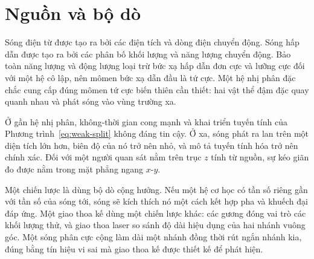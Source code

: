 \section{Nguồn và bộ dò}

Sóng điện từ được tạo ra bởi các điện tích và dòng điện chuyển động. Sóng hấp dẫn được tạo ra bởi các phân bố khối lượng và năng lượng chuyển động. Bảo toàn năng lượng và động lượng loại trừ bức xạ hấp dẫn đơn cực và lưỡng cực đối với một hệ cô lập, nên mômen bức xạ dẫn đầu là tứ cực. Một hệ nhị phân đặc chắc cung cấp đúng mômen tứ cực biến thiên cần thiết: hai vật thể đậm đặc quay quanh nhau và phát sóng vào vùng trường xa.

Ở gần hệ nhị phân, không-thời gian cong mạnh và khai triển tuyến tính của Phương trình~\eqref{eq:weak-split} không đáng tin cậy. Ở xa, sóng phát ra lan trên một diện tích lớn hơn, biên độ của nó trở nên nhỏ, và mô tả tuyến tính hóa trở nên chính xác. Đối với một người quan sát nằm trên trục \(z\) tính từ nguồn, sự kéo giãn đo được nằm trong mặt phẳng ngang \(x\)-\(y\).

\begin{classroomqa}
\end{classroomqa}

Một chiến lược là dùng bộ dò cộng hưởng. Nếu một hệ cơ học có tần số riêng gần với tần số của sóng tới, sóng sẽ kích thích nó một cách kết hợp pha và khuếch đại đáp ứng. Một giao thoa kế dùng một chiến lược khác: các gương đóng vai trò các khối lượng thử, và giao thoa laser so sánh độ dài hiệu dụng của hai nhánh vuông góc. Một sóng phân cực cộng làm dài một nhánh đồng thời rút ngắn nhánh kia, đúng bằng tín hiệu vi sai mà giao thoa kế được thiết kế để phát hiện.

\begin{classroomqa}
\end{classroomqa}

